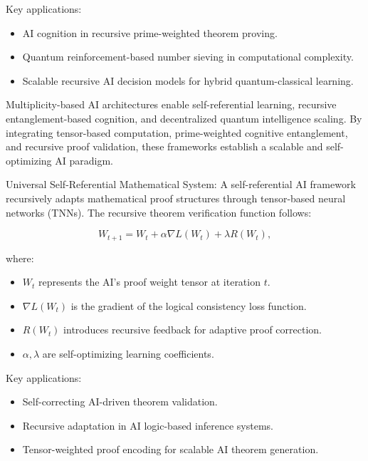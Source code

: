 Key applications:
\begin{itemize}
    \item AI cognition in recursive prime-weighted theorem proving.
    \item Quantum reinforcement-based number sieving in computational complexity.
    \item Scalable recursive AI decision models for hybrid quantum-classical learning.
\end{itemize}



\pa Multiplicity-based AI architectures enable self-referential learning, recursive entanglement-based cognition, and decentralized quantum intelligence scaling. By integrating tensor-based computation, prime-weighted cognitive entanglement, and recursive proof validation, these frameworks establish a scalable and self-optimizing AI paradigm.

\pa Universal Self-Referential Mathematical System: A self-referential AI framework recursively adapts mathematical proof structures through tensor-based neural networks (TNNs). The recursive theorem verification function follows:

\begin{equation}
W_{t+1} = W_t + \alpha \nabla L(W_t) + \lambda R(W_t),
\end{equation}

where:
\begin{itemize}
    \item $W_t$ represents the AI's proof weight tensor at iteration $t$.
    \item $\nabla L(W_t)$ is the gradient of the logical consistency loss function.
    \item $R(W_t)$ introduces recursive feedback for adaptive proof correction.
    \item $\alpha, \lambda$ are self-optimizing learning coefficients.
\end{itemize}

Key applications:
\begin{itemize}
    \item Self-correcting AI-driven theorem validation.
    \item Recursive adaptation in AI logic-based inference systems.
    \item Tensor-weighted proof encoding for scalable AI theorem generation.
\end{itemize}

